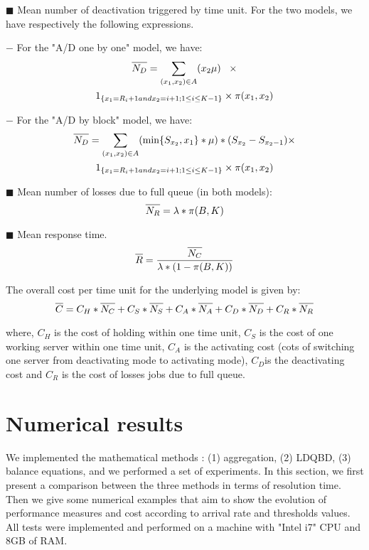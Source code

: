\documentclass[conference]{IEEEtran}
\begin{document}
$\blacksquare$ Mean number of deactivation triggered by time unit. For the two models, we have respectively the following expressions.

$-$ For the  "A/D one by one" model, we have:
\begin{multline}
\overline{\mathstrut N_{D}}=\sum_{(x_{1},x_{2}) \in A}(x_{2}\mu)\;\;\;\times\\
1_{\{x_{1}=R_{i}+1 \mbox{ and } x_{2}=i+1 \mbox{ ; } 1 \leq i \leq K-1\}}\times\pi(x_{1},x_{2})
\end{multline}

$-$ For the  "A/D by block" model, we have:
\begin{multline}
\overline{\mathstrut N_{D}}=\sum_{(x_{1},x_{2}) \in A}(\min\{S_{x_{2}},x_{1}\}*\mu)*(S_{x_2}-S_{x_2-1})\times \\
1_{\{x_{1}=R_{i}+1 \mbox{ and } x_{2}=i+1 \mbox{ ; } 1 \leq i \leq K-1\}}
\times\pi(x_{1},x_{2})
\end{multline}

$\blacksquare$ Mean number of losses  due to full queue (in both models):
\begin{equation}
    \overline{\mathstrut N_{R}}=\lambda*\pi(B,K)
\end{equation}

$\blacksquare$ Mean response time.
\begin{equation}
    \label{formule:tempsreponse}
    \overline{\mathstrut R}=\frac{\overline{\mathstrut N_{C}}}{\lambda*(1-\pi(B,K))}
\end{equation}

The overall cost per  time unit for the underlying model is given by:
\begin{equation}
    \label{formule:cost}
    \overline{\mathstrut C}=C_{H}*\overline{\mathstrut N_{C}}+C_{S}*\overline{\mathstrut N_{S}}+C_{A}*\overline{\mathstrut N_{A}}+C_{D}*\overline{\mathstrut N_{D}}+C_{R}*\overline{\mathstrut N_{R}}
\end{equation}

where, $C_{H}$ is the cost of holding within one time unit,
$C_{S}$ is the  cost of one working server within one time unit,
 $C_{A}$ is the activating cost (cots of switching one server from deactivating mode to activating mode),
 $C_{D}$is the deactivating cost  and   $C_{R}$ is the cost of losses jobs due to full queue.



\section{Numerical results\label{sec:ResNum}}
We implemented the mathematical methods : (1) aggregation, (2) LDQBD, (3) balance equations, and we performed a set of experiments. In this section, we first present a comparison between the three methods in terms of resolution time. Then we give some numerical examples that aim to show the evolution of performance measures and cost according to arrival rate and thresholds values. All tests were implemented and performed on a machine with "Intel i7" CPU and 8GB of RAM.
\end{document}
